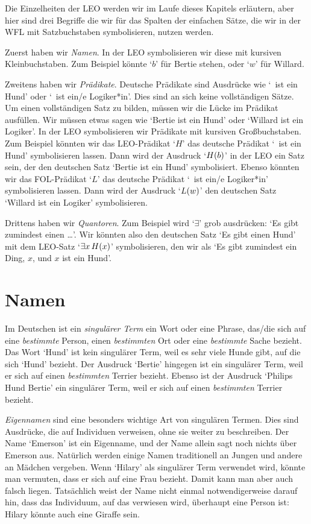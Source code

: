 Die Einzelheiten der LEO werden wir im Laufe dieses Kapitels erläutern, aber hier sind drei Begriffe die wir für das Spalten der einfachen Sätze, die wir in der WFL mit Satzbuchstaben symbolisieren, nutzen werden.

Zuerst haben wir \emph{Namen}. In der LEO symbolisieren wir diese mit kursiven Kleinbuchstaben. Zum Beispiel könnte `$b$' für Bertie stehen, oder `$w$' für Willard.

Zweitens haben wir \emph{Prädikate}. Deutsche Prädikate sind Ausdrücke wie `\blank\ ist ein Hund' oder `\blank\ ist ein/e Logiker*in'. Dies sind an sich keine vollständigen Sätze. Um einen vollständigen Satz zu bilden, müssen wir die Lücke im Prädikat ausfüllen. Wir müssen etwas sagen wie `Bertie ist ein Hund' oder `Willard ist ein Logiker'. In der LEO symbolisieren wir Prädikate mit kursiven Gro{\ss}buchstaben. Zum Beispiel könnten wir das LEO-Prädikat `$H$' das deutsche Prädikat `\blank\ ist ein Hund' symbolisieren lassen. Dann wird der Ausdruck `$\mathord{H}(b)$' in der LEO ein Satz sein, der den deutschen Satz `Bertie ist ein Hund' symbolisiert. Ebenso könnten wir das FOL-Prädikat `$L$' das deutsche Prädikat `\blank\ ist ein/e Logiker*in' symbolisieren lassen. Dann wird der Ausdruck `$\mathord{L}(w)$' den deutschen Satz `Willard ist ein Logiker' symbolisieren.

Drittens haben wir \emph{Quantoren}. Zum Beispiel wird `$\exists$' grob ausdrücken: `Es gibt zumindest einen \ldots'. Wir könnten also den deutschen Satz `Es gibt einen Hund' mit dem LEO-Satz `$\exists x\, \mathord{H}(x)$' symbolisieren, den wir als `Es gibt zumindest ein Ding, $x$, und $x$ ist ein Hund'.

\section{Namen}
Im Deutschen ist ein \emph{singulärer Term} ein Wort oder eine Phrase, das/die sich auf eine \emph{bestimmte} Person, einen \emph{bestimmten} Ort oder eine \emph{bestimmte} Sache bezieht. Das Wort `Hund' ist kein singulärer Term, weil es sehr viele Hunde gibt, auf die sich `Hund' bezieht. Der Ausdruck `Bertie' hingegen ist ein singulärer Term, weil er sich auf einen \emph{bestimmten} Terrier bezieht. Ebenso ist der Ausdruck `Philips Hund Bertie' ein singulärer Term, weil er sich auf einen \emph{bestimmten} Terrier bezieht. 

\emph{Eigennamen} sind eine besonders wichtige Art von singulären Termen. Dies sind Ausdrücke, die auf Individuen verweisen, ohne sie weiter zu beschreiben. Der Name `Emerson' ist ein Eigenname, und der Name allein sagt noch nichts über Emerson aus. Natürlich werden einige Namen traditionell an Jungen und andere an Mädchen vergeben. Wenn `Hilary' als singulärer Term verwendet wird, könnte man vermuten, dass er sich auf eine Frau bezieht. Damit kann man aber auch falsch liegen. Tatsächlich weist der Name nicht einmal notwendigerweise darauf hin, dass das Individuum, auf das verwiesen wird, überhaupt eine Person ist: Hilary könnte auch eine Giraffe sein. 

